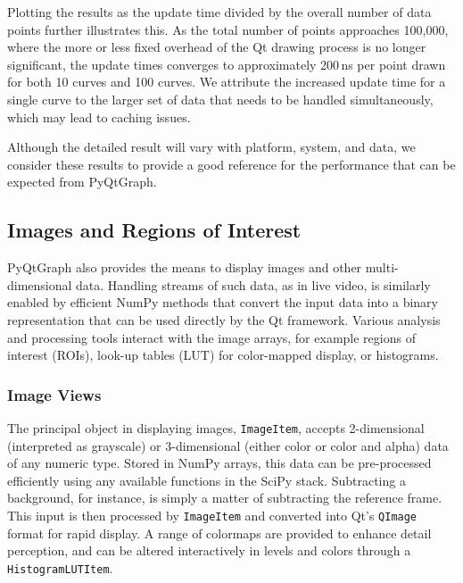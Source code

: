 Plotting the results as the update time divided by the overall number of data points further illustrates this. As the total number of points approaches 100,000, where the more or less fixed overhead of the Qt drawing process is no longer significant, the update times converges to approximately 200\,ns per point drawn for both 10 curves and 100 curves. We attribute the increased update time for a single curve to the larger set of data that needs to be handled simultaneously, which may lead to caching issues.

Although the detailed result will vary with platform, system, and data, we consider these results to provide a good reference for the performance that can be expected from PyQtGraph.

\makeLineBenchmarkFig

\subsection{Images and Regions of Interest}

PyQtGraph also provides the means to display images and other multi-dimensional data. Handling streams of such data, as in live video, is similarly enabled by efficient NumPy methods that convert the input data into a binary representation that can be used directly by the Qt framework. Various analysis and processing tools interact with the image arrays, for example regions of interest (ROIs), look-up tables (LUT) for color-mapped display, or histograms.

\subsubsection{Image Views}

\makeARBBenchmarkFig

\makeMatplotlibComparison

The principal object in displaying images, \texttt{ImageItem}, accepts 2-dimensional (interpreted as grayscale) or 3-dimensional (either color or color and alpha) data of any numeric type. Stored in NumPy arrays, this data can be pre-processed efficiently using any available functions in the SciPy stack. Subtracting a background, for instance, is simply a matter of subtracting the reference frame. This input is then processed by \texttt{ImageItem} and converted into Qt's \texttt{QImage} format for rapid display. A range of colormaps are provided to enhance detail perception, and can be altered interactively in levels and colors through a \texttt{HistogramLUTItem}.

